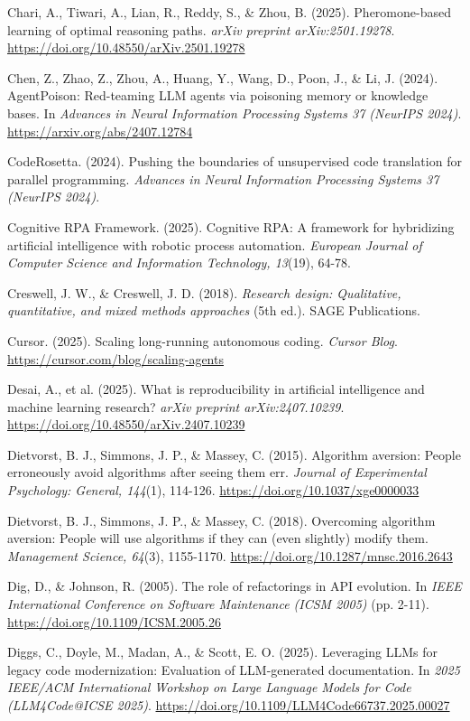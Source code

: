 \documentclass[12pt,a4paper]{article}
\begin{document}
Chari, A., Tiwari, A., Lian, R., Reddy, S., \& Zhou, B. (2025).
Pheromone-based learning of optimal reasoning paths. \emph{arXiv
preprint arXiv:2501.19278}.
\url{https://doi.org/10.48550/arXiv.2501.19278}

Chen, Z., Zhao, Z., Zhou, A., Huang, Y., Wang, D., Poon, J., \& Li, J.
(2024). AgentPoison: Red-teaming LLM agents via poisoning memory or
knowledge bases. In \emph{Advances in Neural Information Processing
Systems 37 (NeurIPS 2024)}. \url{https://arxiv.org/abs/2407.12784}

CodeRosetta. (2024). Pushing the boundaries of unsupervised code
translation for parallel programming. \emph{Advances in Neural
Information Processing Systems 37 (NeurIPS 2024)}.

Cognitive RPA Framework. (2025). Cognitive RPA: A framework for
hybridizing artificial intelligence with robotic process automation.
\emph{European Journal of Computer Science and Information Technology,
13}(19), 64-78.

Creswell, J. W., \& Creswell, J. D. (2018). \emph{Research design:
Qualitative, quantitative, and mixed methods approaches} (5th ed.). SAGE
Publications.

Cursor. (2025). Scaling long-running autonomous coding. \emph{Cursor
Blog}. \url{https://cursor.com/blog/scaling-agents}

Desai, A., et al. (2025). What is reproducibility in artificial
intelligence and machine learning research? \emph{arXiv preprint
arXiv:2407.10239}. \url{https://doi.org/10.48550/arXiv.2407.10239}

Dietvorst, B. J., Simmons, J. P., \& Massey, C. (2015). Algorithm
aversion: People erroneously avoid algorithms after seeing them err.
\emph{Journal of Experimental Psychology: General, 144}(1), 114-126.
\url{https://doi.org/10.1037/xge0000033}

Dietvorst, B. J., Simmons, J. P., \& Massey, C. (2018). Overcoming
algorithm aversion: People will use algorithms if they can (even
slightly) modify them. \emph{Management Science, 64}(3), 1155-1170.
\url{https://doi.org/10.1287/mnsc.2016.2643}

Dig, D., \& Johnson, R. (2005). The role of refactorings in API
evolution. In \emph{IEEE International Conference on Software
Maintenance (ICSM 2005)} (pp. 2-11).
\url{https://doi.org/10.1109/ICSM.2005.26}

Diggs, C., Doyle, M., Madan, A., \& Scott, E. O. (2025). Leveraging LLMs
for legacy code modernization: Evaluation of LLM-generated
documentation. In \emph{2025 IEEE/ACM International Workshop on Large
Language Models for Code (LLM4Code@ICSE 2025)}.
\url{https://doi.org/10.1109/LLM4Code66737.2025.00027}
\end{document}
